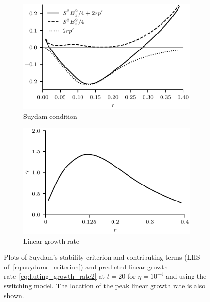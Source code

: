\begin{figure}[t]
  \centering
    \begin{subfigure}{0.49\textwidth}
      \includegraphics[width=\linewidth]{suydam_condition_4.pdf}
      \caption{Suydam condition}
      \label{fig:suydam_condition_4}
    \end{subfigure}
    \hfill
    \begin{subfigure}{0.49\textwidth}
      \includegraphics[width=\linewidth]{growth_rate_4.pdf}
      \caption{Linear growth rate}
      \label{fig:growth_rate_4}
    \end{subfigure}
\caption{Plots of Suydam's stability criterion and contributing terms (LHS of~\eqref{eq:suydams_criterion}) and predicted linear growth rate~\eqref{eq:fluting_growth_rate2} at $t=20$ for $\eta=10^{-4}$ and using the switching model. The location of the peak linear growth rate is also shown.}
\label{fig:stability_and_growth}%
\end{figure}

